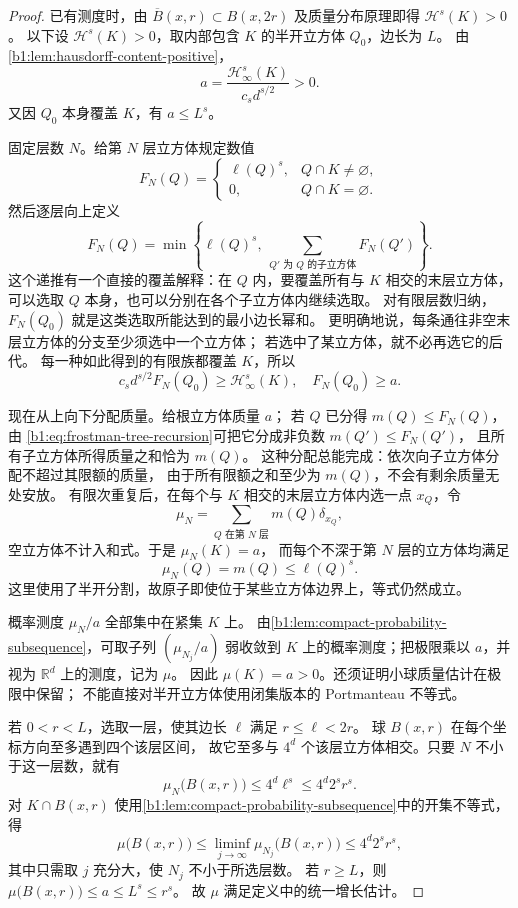 \begin{proof}
已有测度时，由 \(\overline B(x,r)\subset B(x,2r)\) 及质量分布原理即得
\(\mathcal H^s(K)>0\)。
以下设 \(\mathcal H^s(K)>0\)，取内部包含 \(K\) 的半开立方体 \(Q_0\)，边长为 \(L\)。
由\cref{b1:lem:hausdorff-content-positive}，
\[
 a=\frac{\mathcal H^s_\infty(K)}{c_s d^{s/2}}>0.
\]
又因 \(Q_0\) 本身覆盖 \(K\)，有 \(a\leq L^s\)。

固定层数 \(N\)。给第 \(N\) 层立方体规定数值
\[
 F_N(Q)=
 \begin{cases}
  \ell(Q)^s,&Q\cap K\ne\varnothing,\\
  0,&Q\cap K=\varnothing.
 \end{cases}
\]
然后逐层向上定义
\begin{equation}\label{b1:eq:frostman-tree-recursion}
 F_N(Q)=\min\left\{\ell(Q)^s,\ \sum_{Q'\text{ 为 }Q\text{ 的子立方体}}F_N(Q')\right\}.
\end{equation}
这个递推有一个直接的覆盖解释：在 \(Q\) 内，要覆盖所有与 \(K\) 相交的末层立方体，
可以选取 \(Q\) 本身，也可以分别在各个子立方体内继续选取。
对有限层数归纳，\(F_N(Q_0)\) 就是这类选取所能达到的最小边长幂和。
更明确地说，每条通往非空末层立方体的分支至少须选中一个立方体；
若选中了某立方体，就不必再选它的后代。
每一种如此得到的有限族都覆盖 \(K\)，所以
\[
 c_s d^{s/2} F_N(Q_0)\geq\mathcal H^s_\infty(K),
 \quad F_N(Q_0)\geq a.
\]

现在从上向下分配质量。给根立方体质量 \(a\)；
若 \(Q\) 已分得 \(m(Q)\leq F_N(Q)\)，由%
\eqref{b1:eq:frostman-tree-recursion}可把它分成非负数 \(m(Q')\leq F_N(Q')\)，
且所有子立方体所得质量之和恰为 \(m(Q)\)。
这种分配总能完成：依次向子立方体分配不超过其限额的质量，
由于所有限额之和至少为 \(m(Q)\)，不会有剩余质量无处安放。
有限次重复后，在每个与 \(K\) 相交的末层立方体内选一点 \(x_Q\)，令
\[
 \mu_N=\sum_{Q\text{ 在第 }N\text{ 层}}m(Q)\delta_{x_Q},
\]
空立方体不计入和式。于是 \(\mu_N(K)=a\)，
而每个不深于第 \(N\) 层的立方体均满足
\[
 \mu_N(Q)=m(Q)\leq\ell(Q)^s.
\]
这里使用了半开分割，故原子即使位于某些立方体边界上，等式仍然成立。

概率测度 \(\mu_N/a\) 全部集中在紧集 \(K\) 上。
由\cref{b1:lem:compact-probability-subsequence}，可取子列 \((\mu_{N_j}/a)\)
弱收敛到 \(K\) 上的概率测度；把极限乘以 \(a\)，并视为
\(\mathbb R^d\) 上的测度，记为 \(\mu\)。
因此 \(\mu(K)=a>0\)。还须证明小球质量估计在极限中保留；
不能直接对半开立方体使用闭集版本的 Portmanteau 不等式。

若 \(0<r<L\)，选取一层，使其边长 \(\ell\) 满足 \(r\leq\ell<2r\)。
球 \(B(x,r)\) 在每个坐标方向至多遇到四个该层区间，
故它至多与 \(4^d\) 个该层立方体相交。只要 \(N\) 不小于这一层数，就有
\[
 \mu_N\bigl(B(x,r)\bigr)\leq4^d\ell^s\leq4^d2^s r^s.
\]
对 \(K\cap B(x,r)\) 使用\cref{b1:lem:compact-probability-subsequence}中的开集不等式，得
\[
 \mu\bigl(B(x,r)\bigr)
 \leq\liminf_{j\to\infty}\mu_{N_j}\bigl(B(x,r)\bigr)
 \leq4^d2^s r^s,
\]
其中只需取 \(j\) 充分大，使 \(N_j\) 不小于所选层数。
若 \(r\geq L\)，则 \(\mu\bigl(B(x,r)\bigr)\leq a\leq L^s\leq r^s\)。
故 \(\mu\) 满足定义中的统一增长估计。
\end{proof}

